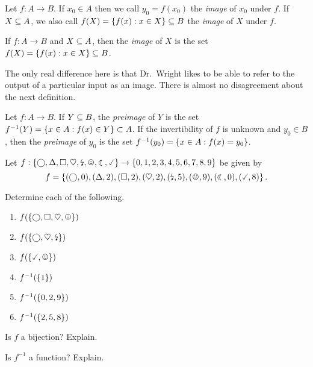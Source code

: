 \begin{definition}  Let $f: A \to B$.  If $x_0 \in A$ then we call $y_0= f(x_0)$ the \textit{image} of $x_0$ under $f$.  If $X \subseteq A$, we also call $f(X) = \left\{f(x): x\in X\right\} \subseteq B$ the \textit{image} of $X$ under $f$.
\end{definition}

\begin{definition} If $f: A \to B$ and $X \subseteq A$, then the \textit{image} of $X$ is the set $f(X) = \left\{f(x):x \in X\right\} \subseteq B$.
\end{definition}

The only real difference here is that Dr.~Wright likes to be able to refer to the output of a particular input as an image.  There is almost no disagreement about the next definition.

\begin{definition}[Preimage]  Let $f: A \to B$.  If $Y \subseteq B$, the \textit{preimage} of $Y$ is the set $f^{-1}(Y) = \left\{x \in A:f(x) \in Y\right\} \subset A$.  If the invertibility of $f$ is unknown and $y_0 \in B$, then the \textit{preimage} of $y_0$ is the set $f^{-1}(y_0) = \left\{x \in A: f(x)=y_0\right\}$.  
\end{definition}

\begin{question}[resume]
\item Let $f: \set{\bigcirc,\Delta,\square,\heartsuit,\text{\lightning},\text{\smiley},\text{\leftmoon},\text{\checked}} \to \set{0,1,2,3,4,5,6,7,8,9}$ be given by
\[f = \set{(\bigcirc,0),(\Delta,2),(\square,2),(\heartsuit,2),(\text{\lightning},5),(\text{\smiley},9),(\text{\leftmoon},0),(\text{\checked},8)}.\]
	\begin{qpart}
	\item Determine each of the following.
	\begin{enumerate}[label=(\roman*)] \itemsep=.3in
	\item $f(\set{\bigcirc,\square,\heartsuit,\text{\smiley}})$
	\item $f(\left\{\bigcirc,\heartsuit,\text{\lightning}\right\})$
	\item $f(\set{\text{\checked},\text{\smiley}})$
	\item $f^{-1}(\left\{1\right\})$
	\item $f^{-1}(\left\{0,2,9\right\})$
	\item $f^{-1}(\left\{2,5,8\right\})$
	\vspace{.3in}
	\end{enumerate}
	\item Is $f$ a bijection?  Explain.
	
	\vspace{2in}
	
	\item Is $f^{-1}$ a function?  Explain.
	
	\vspace{2in}
	\end{qpart}
\end{question}





